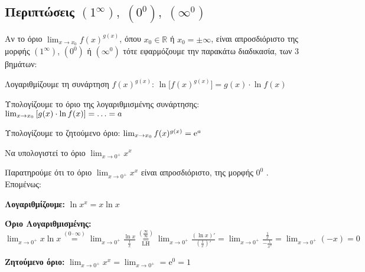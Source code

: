 \subsection*{Περιπτώσεις $ (1^{\infty}), \; (0^{0}), \; (\infty^{0}) $}

Αν το όριο $ \lim_{x \to x_{0}} f(x)^{g(x)} $, όπου $ x_{0} \in
\mathbb{R} $ ή $ x_{0}= \pm \infty $, είναι απροσδιόριστο της μορφής 
$ (1^{\infty}) $, $ (0^0) $ ή $ (\infty^{0}) $ 
τότε εφαρμόζουμε την παρακάτω διαδικασία, των 3 βημάτων:
\begin{myitemize}
  \item \textcolor{Col1}{Λογαριθμίζουμε τη συνάρτηση $ f(x)^{g(x)} $:} $ \ln{\bigl[f(x)^{g(x)}\bigr]} = g(x)\cdot \ln{f(x)} $
  \item \textcolor{Col1}{Υπολογίζουμε το όριο της λογαριθμισμένης συνάρτησης:} 
    $ \lim_{\smash{x \to x_{0}}} \left[g(x)\cdot \ln{f(x)}\right] = \ldots = a $
  \item \textcolor{Col1}{Υπολογίζουμε το ζητούμενο όριο:} 
    $ \lim_{x \to x_{0}} \smash{f(x)^{g(x)}} = \mathrm{e}^{a} $
\end{myitemize}


\begin{example}
  Να υπολογιστεί το όριο $ \lim_{x \to 0^{+}} x^{x} $
\end{example}
\begin{solution}
  Παρατηρούμε ότι το όριο $ \lim_{x \to 0^{+}} x^{x} $ είναι απροσδιόριστο, της μορφής 
  $ 0^{0} $ . Επομένως:
  \begin{myitemize}
    \item \textbf{Λογαριθμίζουμε:} $ \ln{x^{x}} = x \ln{x} $
    \item \textbf{Όριο Λογαριθμισμένης:} $ \lim_{x \to 0^{+}} x \ln{x} \overset{(0 \cdot
      \infty)}{=} \lim_{x \to 0^{+}} \frac{\ln{x}}{\frac{1}{x}}
      \overset{\left(\frac{\infty}{\infty}\right)}{\underset{\mathrm{LH}}{=}}  
      \lim_{x \to 0^{+}} \frac{(\ln{x} )'}{(\frac{1}{x} )'} = \lim_{x \to 0^{+}}
      \frac{\frac{1}{x}}{- \frac{1}{x^{2}}} = \lim_{x \to 0^{+}} (-x) = 0 $
    \item \textbf{Ζητούμενο όριο:} $ \lim_{x \to 0^{+}} x^{x} = \lim_{x \to 0^{+}} = 
      \mathrm{e}^{0} = 1 $ 
  \end{myitemize}
\end{solution}

